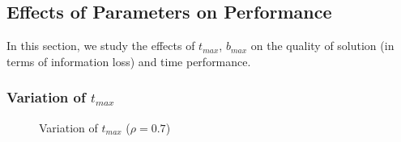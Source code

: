 \subsection{Effects of Parameters on Performance}\label{sec:eval:effect}
In this section,
we study the effects of $t_{max}$, $b_{max}$ on the
quality of solution (in terms of information loss) and time performance.

\subsubsection{Variation of $t_{max}$}\label{sec:eval:timebound}

\begin{figure}[tb]
\centering
{}
\caption{Variation of $t_{max}$ ($\rho = 0.7$)}\label{fig:timebound}
\end{figure}

